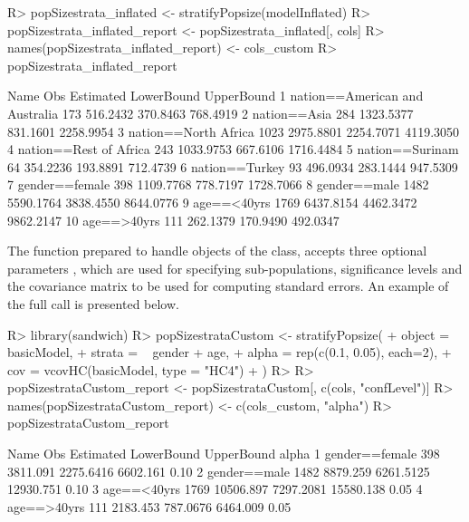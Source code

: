 \documentclass[nojss]{jss}
\newcommand{\1}{\mathcal{I}} \newcommand{\bZero}{\boldsymbol{0}}
\begin{document}
\begin{CodeChunk}
\begin{CodeInput}
R> popSizestrata_inflated <- stratifyPopsize(modelInflated)
R> popSizestrata_inflated_report <- popSizestrata_inflated[, cols]
R> names(popSizestrata_inflated_report) <- cols_custom
R> popSizestrata_inflated_report
\end{CodeInput}
\begin{CodeOutput}
                             Name  Obs Estimated LowerBound UpperBound
1  nation==American and Australia  173  516.2432   370.8463   768.4919
2                    nation==Asia  284 1323.5377   831.1601  2258.9954
3            nation==North Africa 1023 2975.8801  2254.7071  4119.3050
4          nation==Rest of Africa  243 1033.9753   667.6106  1716.4484
5                 nation==Surinam   64  354.2236   193.8891   712.4739
6                  nation==Turkey   93  496.0934   283.1444   947.5309
7                  gender==female  398 1109.7768   778.7197  1728.7066
8                    gender==male 1482 5590.1764  3838.4550  8644.0776
9                     age==<40yrs 1769 6437.8154  4462.3472  9862.2147
10                    age==>40yrs  111  262.1379   170.9490   492.0347
\end{CodeOutput}
\end{CodeChunk}

The  function prepared to handle objects of the
 class, accepts three optional parameters
, which are used for specifying
sub-populations, significance levels and the covariance matrix to be
used for computing standard errors. An example of the full call is
presented below.

\begin{CodeChunk}
\begin{CodeInput}
R> library(sandwich)
R> popSizestrataCustom <- stratifyPopsize(
+   object  = basicModel,
+   strata = ~ gender + age,
+   alpha   = rep(c(0.1, 0.05), each=2),
+   cov     = vcovHC(basicModel, type = "HC4")
+ )
R>
R> popSizestrataCustom_report <- popSizestrataCustom[, c(cols, "confLevel")]
R> names(popSizestrataCustom_report) <- c(cols_custom, "alpha")
R> popSizestrataCustom_report
\end{CodeInput}
\begin{CodeOutput}
            Name  Obs Estimated LowerBound UpperBound alpha
1 gender==female  398  3811.091  2275.6416   6602.161  0.10
2   gender==male 1482  8879.259  6261.5125  12930.751  0.10
3    age==<40yrs 1769 10506.897  7297.2081  15580.138  0.05
4    age==>40yrs  111  2183.453   787.0676   6464.009  0.05
\end{CodeOutput}
\end{CodeChunk}
\end{document}
